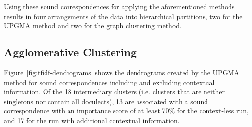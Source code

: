 \documentclass[a4paper]{article}
\begin{document}
Using these sound correspondences for
applying the aforementioned methods results in
four arrangements of the data into hierarchical partitions,
two for the UPGMA method and two for the graph clustering method.

\subsection{Agglomerative Clustering}

Figure~\ref{fig:tfidf-dendrograms} shows the dendrograms
created by the UPGMA method for sound correspondences
including and excluding contextual information.
Of the 18 intermediary clusters
(i.e. clusters that are neither singletons nor contain all doculects),
13 are associated with a sound correspondence with an importance score of at least 70\% for the context-less run,
and 17 for the run with additional contextual information.
\end{document}
